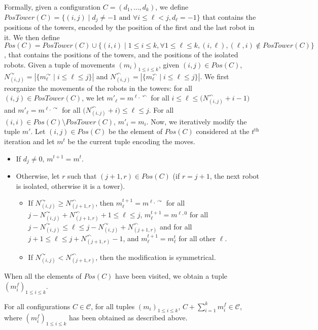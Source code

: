 \documentclass[envcountsame]{llncs} \usepackage[english]{babel}
\newcommand{\Config}{\ensuremath{\mathcal{C}}}
\newcommand{\Sum}[3]{\sum\limits_{#1}^{#2} #3}
\newcommand{\clockwise}{\ensuremath{\curvearrowright}}
\newcommand{\counterclockwise}{\ensuremath{\curvearrowleft}}
\newcommand{\PosTower}{\ensuremath{\mathit{PosTower}}}
\newcommand{\Pos}{\ensuremath{\mathit{Pos}}}
\begin{document}
 Formally, given a configuration $C=(d_1,\dots,d_k)$, we define $\PosTower(C)=\{(i,j)\mid d_j\neq -1\textrm{ and }\forall i\leq \ell< j, d_\ell=-1\}$
 that contains the positions of the towers, encoded by the position of the first and the last robot in it. We then define
$\Pos(C)=\PosTower(C) 
 \cup\{(i,i)\mid 1\leq i\leq k, \forall 1\leq \ell\leq k, (i,\ell),(\ell,i)\notin\PosTower(C)\}$, that contains the positions of the towers, and the positions of the isolated robots.
 Given a tuple of movements $(m_i)_{1\leq i\leq k}$, given $(i,j)\in\Pos(C)$, $N^\clockwise_{(i,j)}=|\{m^\clockwise_\ell\mid i\leq \ell\leq j\}|$ and 
 $N^\counterclockwise_{(i,j)}=|\{m^\counterclockwise_\ell\mid i\leq \ell\leq j\}|$. We first reorganize the movements of the robots in the towers: 
 for all $(i,j)\in\PosTower(C)$, we let $m'_\ell=m^{\ell,\counterclockwise}$ for all $i\leq \ell \leq \bigl(N_{(i,j)}^\counterclockwise +i-1\bigr)$ and 
 $m'_\ell = m^{\ell,\clockwise}$ for all $\bigl(N_{(i,j)}^\counterclockwise +i\bigr)\leq \ell \leq j$. For all $(i,i)\in\Pos(C)\setminus\PosTower(C)$, $m'_i=m_i$. Now, we iteratively
 modify the tuple $m'$. Let $(i,j)\in\Pos(C)$ be the element of $\Pos(C)$ considered at the $t^{\textrm{th}}$ iteration and let $m^t$ be the current tuple encoding the moves. 
 \begin{itemize}
\item If $d_j\neq 0$, $m^{t+1}=m^t$. 
\item Otherwise, let $r$ such that $(j+1,r)\in\Pos(C)$ (if $r=j+1$, the next robot is isolated, otherwise it is a tower). 
 \begin{itemize}
 \item If $N^{\clockwise}_{(i,j)}\geq N^{\counterclockwise}_{(j+1,r)}$, then $m^{t+1}_\ell = m^{\ell, \clockwise}$ for all 
 $j-N^\clockwise_{(i,j)}+N^\counterclockwise_{(j+1,r)}+1\leq \ell\leq j$, $m^{t+1}_\ell=m^{\ell,0}$ for all $j-N^\clockwise_{(i,j)}\leq \ell\leq j-N^\clockwise_{(i,j)}+
 N^\counterclockwise_{(j+1,r)}$ and for all $j+1 \leq \ell \leq j+N^\counterclockwise_{(j+1,r)}-1$, and $m^{t+1}_\ell=m^t_\ell$ for all other $\ell$. 
 \item If $N^{\clockwise}_{(i,j)}< N^{\counterclockwise}_{(j+1,r)}$, then the modification is symmetrical. 
 \end{itemize}
 \end{itemize}
 When all the elements of $\Pos(C)$ have been visited, we obtain a tuple $(m^f_i)_{1\leq i\leq k}$.
 
 \begin{proposition}
For all configurations $C\in\Config$, for all tuples $(m_i)_{1\leq i\leq k}$, $C+\Sum{i=1}{k} m^f_i\in\Config$,
where $(m^f_i)_{1\leq i\leq k}$ has been obtained as described above.
 \end{proposition}
 
\end{document}
